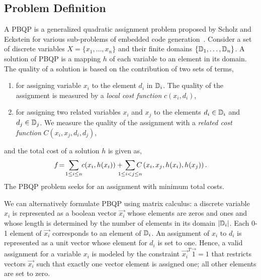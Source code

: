 \subsection{Problem Definition}
A PBQP is a generalized quadratic assignment problem proposed by
Scholz and Eckstein for various sub-problems of embedded code
generation~\cite{ScholzE02,Eck03}. Consider a set of discrete
variables $X=\{x_1,\ldots,x_n\}$ and their finite domains
$\{\mathbb D_1,\ldots,\mathbb D_n\}$. A solution of PBQP is a
mapping $h$ of each variable to an element in its domain. The quality of a
solution is based on the contribution of two sets of terms,
\begin{enumerate}
\item for assigning variable $x_i$ to the element $d_i$ in
  $\mathbb D_i$. The quality of the assignment is measured by a
  \emph{local cost function} $c(x_i, d_i)$,
\item for assigning two related variables $x_i$ and $x_j$ to the
  elements $d_i \in \mathbb D_i$ and $d_j \in \mathbb D_j$.  We
  measure the quality of the assignment with a \emph{related cost
    function\/} $C(x_i,x_j, d_i,d_j)$,
\end{enumerate}
and the total cost of a solution $h$ is given as,
\begin{equation}
  f\! =\! \sum_{1 \leq i \leq n} \hspace{-1mm} c(x_i,h(x_i)) + \hspace{-3mm} \sum_{1 \leq i < j  \leq n} \hspace{-3.5mm}
  C\left (x_i,x_j, h(x_i), h(x_j) \right). \label{eqn-pbqp}
\end{equation}
The PBQP problem seeks for an assignment with minimum total costs.

We can alternatively formulate PBQP using matrix calculus: a discrete
variable $x_i$ is represented as a boolean vector $\vec{x_i}$ whose
elements are zeros and ones and whose length is determined by the
number of elements in its domain $|\mathbb D_i|$. Each 0-1 element of
$\vec{x_i}$ corresponds to an element of $\mathbb D_i$. An assignment
of $x_i$ to $d_i$ is represented as a unit vector whose element for
$d_i$ is set to one. Hence, a valid assignment for a variable $x_i$ is
modeled by the constraint $\vec{x_i}^T \vec{1}=1$ that restricts
vectors $\vec{x_i}$ such that exactly one vector element is assigned
one; all other elements are set to zero.

